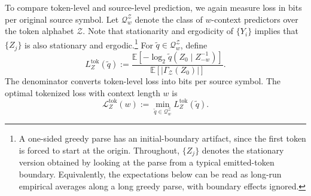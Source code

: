 \documentclass{article}
\theoremstyle{plain}
\theoremstyle{definition}
\theoremstyle{remark}
\begin{document}
    To compare token-level and source-level prediction, we again measure loss in
    bits per original source symbol. Let $\mathcal{Q}_w^{\mathcal{Z}}$ denote the
    class of $w$-context predictors over the token alphabet $\mathcal{Z}$. Note that stationarity and ergodicity of $\{Y_i\}$ implies that $\{Z_j\}$ is also stationary and ergodic.\footnote{A one-sided greedy parse has an initial-boundary artifact, since the first token is forced to start at the origin. Throughout, $\{Z_j\}$ denotes the stationary version obtained by looking at the parse from a typical emitted-token boundary. Equivalently, the expectations below can be read as long-run empirical averages along a long greedy parse, with boundary effects ignored.} For
    $\tilde q\in\mathcal{Q}_w^{\mathcal{Z}}$, define
    \[
        L_Z^{\mathrm{tok}}(\tilde q)
        :=
        \frac{
            \mathbb{E}\!\left[
                -\log_2
                \tilde q\!\left(
                    Z_0 \mid Z_{-w}^{-1}
                \right)
            \right]
        }{
            \mathbb{E}\!\left[
                |\Gamma_{\mathcal{Z}}(Z_0)|
            \right]
        }.
    \]
    The denominator converts token-level loss into bits per source symbol. The
    optimal tokenized loss with context length $w$ is
    \[
        \mathcal{L}_Z^{\mathrm{tok}}(w)
        :=
        \min_{\tilde q\in\mathcal{Q}_w^{\mathcal{Z}}}
        L_Z^{\mathrm{tok}}(\tilde q).
    \]
    
    
\end{document}
